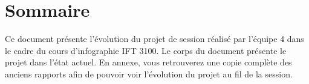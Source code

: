 \chapter{Sommaire}
\label{s:sommaire}

Ce document présente l'évolution du projet de session réalisé par l'équipe 4 dans le cadre du cours d'infographie IFT 3100. Le corps du document présente le projet dans l'état actuel. En annexe, vous retrouverez une copie complète des anciens rapports afin de pouvoir voir l'évolution du projet au fil de la session.